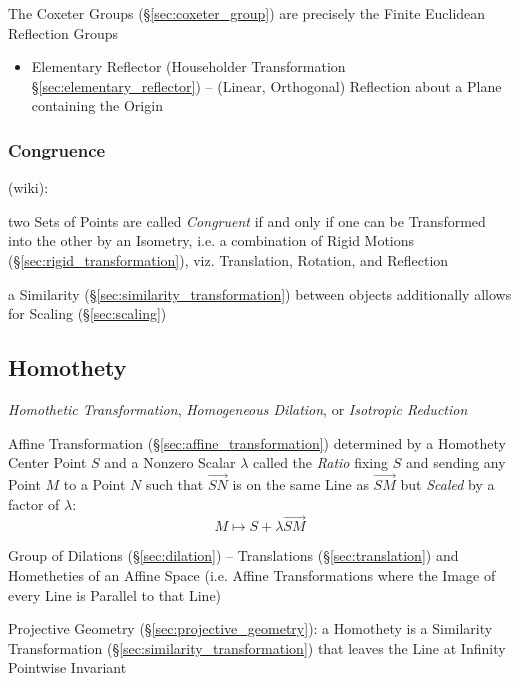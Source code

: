 The Coxeter Groups (\S\ref{sec:coxeter_group}) are precisely the Finite
Euclidean Reflection Groups

\begin{itemize}
  \item Elementary Reflector (Householder Transformation
    \S\ref{sec:elementary_reflector}) -- (Linear, Orthogonal) Reflection about
    a Plane containing the Origin
\end{itemize}



\subsubsection{Congruence}\label{sec:congruence}

(wiki):

two Sets of Points are called \emph{Congruent} if and only if one can be
Transformed into the other by an Isometry, i.e. a combination of Rigid Motions
(\S\ref{sec:rigid_transformation}), viz. Translation, Rotation, and Reflection

\fist a Similarity (\S\ref{sec:similarity_transformation}) between objects
additionally allows for Scaling (\S\ref{sec:scaling})



\subsection{Homothety}\label{sec:homothety}

\emph{Homothetic Transformation}, \emph{Homogeneous Dilation}, or
\emph{Isotropic Reduction}

Affine Transformation (\S\ref{sec:affine_transformation}) determined by a
Homothety Center Point $S$ and a Nonzero Scalar $\lambda$ called the
\emph{Ratio} fixing $S$ and sending any Point $M$ to a Point $N$ such that
$\vec{SN}$ is on the same Line as $\vec{SM}$ but \emph{Scaled} by a factor of
$\lambda$:
\[
  M \mapsto S + \lambda\vec{SM}
\]

Group of Dilations (\S\ref{sec:dilation}) -- Translations
(\S\ref{sec:translation}) and Hometheties of an Affine Space (i.e. Affine
Transformations where the Image of every Line is Parallel to that Line)

\fist Projective Geometry (\S\ref{sec:projective_geometry}): a Homothety is a
Similarity Transformation (\S\ref{sec:similarity_transformation}) that leaves
the Line at Infinity Pointwise Invariant

